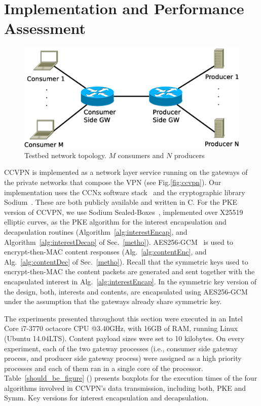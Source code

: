 \section{Implementation and Performance Assessment}\label{sec:exp}

\begin{figure}[]
\centering
\includegraphics[width=\columnwidth]{images/testnet.eps}
\caption{Testbed network topology. $M$ consumers and $N$ producers}\label{testnet}
\end{figure}

CCVPN is implemented as a network layer service running on the gateways of the private networks that compose the VPN (see Fig.\ref{fig:ccvpn}).
Our implementation uses the CCNx software stack~\cite{CCNxGithub} and the cryptographic library Sodium~\cite{sodiumGithub}. These are both publicly available and written in C.
For the PKE version of CCVPN, we use Sodium Sealed-Boxes~\cite{bernstein2006curve25519}, implemented over X25519 elliptic curves, as the PKE algorithm for the interest encapsulation and decapsulation routines (Algorithm~\ref{alg:interestEncap}, and Algorithm~\ref{alg:interestDecap} of Sec.~\ref{metho}).
AES256-GCM~\cite{dworkin2007recommendation} is used to encrypt-then-MAC content responses (Alg.~\ref{alg:contentEnc}, and Alg.~\ref{alg:contentDec} of Sec.~\ref{metho}).
Recall that the symmetric keys used to encrypt-then-MAC the content packets are generated and sent together with the encapsulated interest in Alg.~\ref{alg:interestEncap}.
In the symmetric key version of the design, both, interests and contents, are encapsulated using AES256-GCM under the assumption that the gateways already share symmetric key.


The experiments presented throughout this section were executed in an Intel Core i7-3770 octacore CPU @3.40GHz, with 16GB of RAM, running Linux (Ubuntu 14.04LTS). Content payload sizes were set to 10 kilobytes.
On every experiment, each of the two gateway processes (i.e., consumer side gateway process, and producer side gateway process) were assigned as a high priority processes and each of them ran in a single core of the processor.
Table~\ref{should_be_figure} () presents boxplots for the execution times of the four algorithms involved in CCVPN's data transmission, including both, PKE and Symm. Key versions for interest encapsulation and decapsulation.

